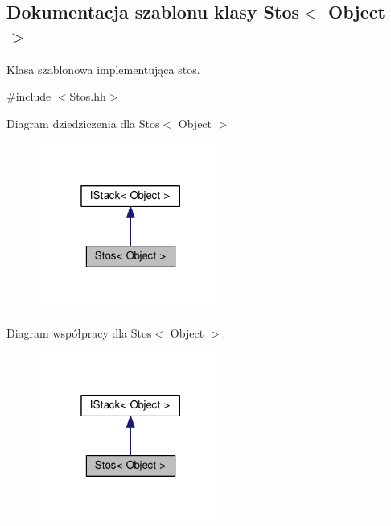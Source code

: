 \hypertarget{class_stos}{\subsection{Dokumentacja szablonu klasy Stos$<$ Object $>$}
\label{class_stos}
}


Klasa szablonowa implementująca stos.  




{\ttfamily \#include $<$Stos.\-hh$>$}



Diagram dziedziczenia dla Stos$<$ Object $>$
\nopagebreak
\begin{figure}[H]
\begin{center}
\leavevmode
\includegraphics[width=172pt]{class_stos__inherit__graph}
\end{center}
\end{figure}


Diagram współpracy dla Stos$<$ Object $>$\-:
\nopagebreak
\begin{figure}[H]
\begin{center}
\leavevmode
\includegraphics[width=172pt]{class_stos__coll__graph}
\end{center}
\end{figure}
